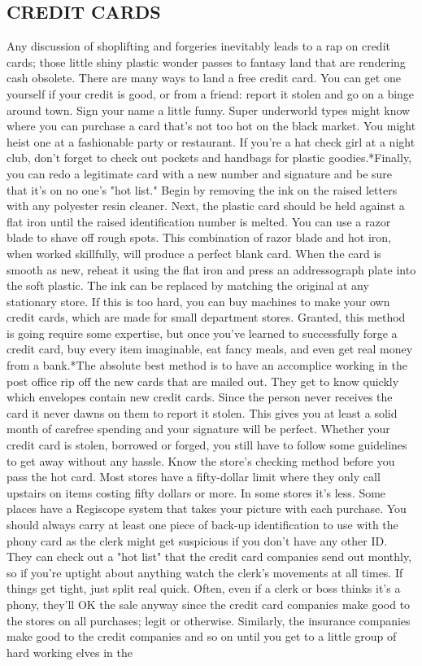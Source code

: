 \documentclass[11pt,twoside,a4paper]{book}
\begin{document}
\subsection{CREDIT CARDS}

Any discussion of shoplifting and forgeries inevitably leads to a rap on credit cards; those little shiny plastic wonder passes to fantasy land that are rendering cash obsolete. There are many ways to land a free credit card. You can get one yourself if your credit is good, or from a friend: report it stolen and go on a binge around town. Sign your name a little funny. Super underworld types might know where you can purchase a card that's not too hot on the black market. You might heist one at a fashionable party or restaurant. If you're a hat check girl at a night club, don't forget to check out pockets and handbags for plastic goodies.*Finally, you can redo a legitimate card with a new number and signature and be sure that it's on no one's "hot list." Begin by removing the ink on the raised letters with any polyester resin cleaner. Next, the plastic card should be held against a flat iron until the raised identification number is melted. You can use a razor blade to shave off rough spots. This combination of razor blade and hot iron, when worked skillfully, will produce a perfect blank card. When the card is smooth as new, reheat it using the flat iron and press an addressograph plate into the soft plastic. The ink can be replaced by matching the original at any stationary store. If this is too hard, you can buy machines to make your own credit cards, which are made for small department stores. Granted, this method is going require some expertise, but once you've learned to successfully forge a credit card, buy every item imaginable, eat fancy meals, and even get real money from a bank.*The absolute best method is to have an accomplice working in the post office rip off the new cards that are mailed out. They get to know quickly which envelopes contain new credit cards. Since the person never receives the card it never dawns on them to report it stolen. This gives you at least a solid month of carefree spending and your signature will be perfect. Whether your credit card is stolen, borrowed or forged, you still have to follow some guidelines to get away without any hassle. Know the store's checking method before you pass the hot card. Most stores have a fifty-dollar limit where they only call upstairs on items costing fifty dollars or more. In some stores it's less. Some places have a Regiscope system that takes your picture with each purchase. You should always carry at least one piece of back-up identification to use with the phony card as the clerk might get suspicious if you don't have any other ID. They can check out a "hot list" that the credit card companies send out monthly, so if you're uptight about anything watch the clerk's movements at all times. If things get tight, just split real quick. Often, even if a clerk or boss thinks it's a phony, they'll OK the sale anyway since the credit card companies make good to the stores on all purchases; legit or otherwise. Similarly, the insurance companies make good to the credit companies and so on until you get to a little group of hard working elves in the 
\end{document}
